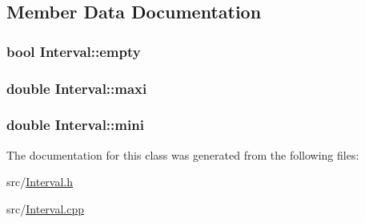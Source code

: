\subsection{Member Data Documentation}
\subsubsection[{\texorpdfstring{empty}{empty}}]{\setlength{\rightskip}{0pt plus 5cm}bool Interval\+::empty\hspace{0.3cm}{\ttfamily [private]}}\hypertarget{classInterval_a9d9385e1ce6637e5760d26bf80aeada6}{}\label{classInterval_a9d9385e1ce6637e5760d26bf80aeada6}
\subsubsection[{\texorpdfstring{maxi}{maxi}}]{\setlength{\rightskip}{0pt plus 5cm}double Interval\+::maxi\hspace{0.3cm}{\ttfamily [private]}}\hypertarget{classInterval_ac086c91ab2c6f75ce8b3ff3818b38798}{}\label{classInterval_ac086c91ab2c6f75ce8b3ff3818b38798}
\subsubsection[{\texorpdfstring{mini}{mini}}]{\setlength{\rightskip}{0pt plus 5cm}double Interval\+::mini\hspace{0.3cm}{\ttfamily [private]}}\hypertarget{classInterval_aeb6ee750751e32a0f92d23f0a44ab122}{}\label{classInterval_aeb6ee750751e32a0f92d23f0a44ab122}


The documentation for this class was generated from the following files\+:\begin{DoxyCompactItemize}
\item 
src/\hyperlink{Interval_8h}{Interval.\+h}\item 
src/\hyperlink{Interval_8cpp}{Interval.\+cpp}\end{DoxyCompactItemize}
